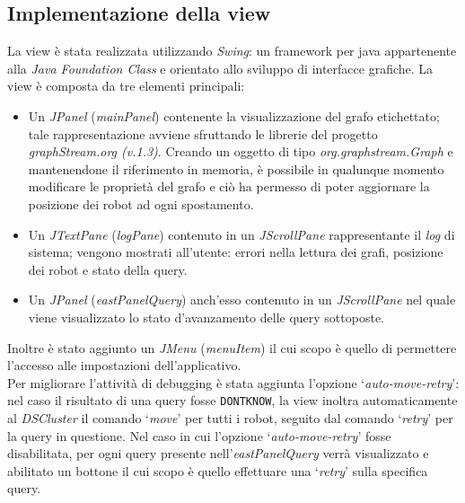 \subsection{Implementazione della view}
\label{sec:viewImpl}
La view  è stata realizzata utilizzando \emph{Swing}:
un framework per java appartenente
alla \emph{Java Foundation Class} e orientato allo sviluppo di interfacce grafiche.
La view è composta da tre elementi principali:
\begin{itemize}
	\item Un \emph{JPanel} (\emph{mainPanel}) contenente la visualizzazione
	del grafo etichettato; tale rappresentazione avviene sfruttando le librerie del progetto \emph{graphStream.org (v.1.3)}. Creando un oggetto di tipo \emph{org.graphstream.Graph} e mantenendone il riferimento in memoria, è possibile in qualunque momento modificare le proprietà
	del grafo e ciò ha permesso di poter aggiornare la posizione dei robot ad ogni spostamento.
	\item Un \emph{JTextPane} (\emph{logPane}) contenuto in un \emph{JScrollPane} rappresentante il \emph{log} di sistema; vengono mostrati all'utente: errori nella lettura dei grafi, posizione dei robot e stato della query.
	\item Un \emph{JPanel} (\emph{eastPanelQuery}) anch'esso contenuto in un \emph{JScrollPane} nel quale viene visualizzato lo stato d'avanzamento delle query sottoposte.
\end{itemize}
Inoltre è stato aggiunto un \emph{JMenu} (\emph{menuItem}) il cui scopo è quello di permettere l'accesso alle impostazioni dell'applicativo.\\

Per migliorare l'attività di debugging è stata aggiunta l'opzione `\emph{auto-move-retry}': nel caso il
risultato di una query fosse \texttt{DONTKNOW}, la view inoltra automaticamente al \emph{DSCluster} il comando `\emph{move}' per tutti i robot, seguito dal comando `\emph{retry}'
per la query in questione.
Nel caso in cui l'opzione `\emph{auto-move-retry}' fosse disabilitata, per ogni query presente nell'\emph{eastPanelQuery} verrà visualizzato e abilitato un bottone il cui scopo è quello effettuare
una `\emph{retry}' sulla specifica query.\\

